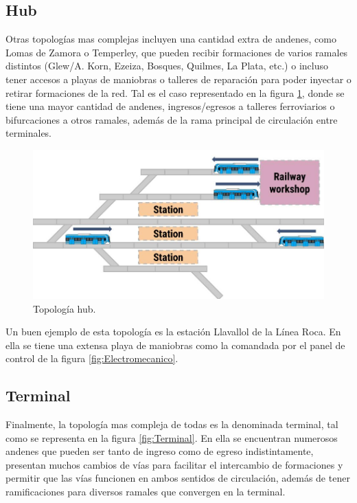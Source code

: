 	\subsection{Hub}
	
		Otras topologías mas complejas incluyen una cantidad extra de andenes, como Lomas de Zamora o Temperley, que pueden recibir formaciones de varios ramales distintos (Glew/A. Korn, Ezeiza, Bosques, Quilmes, La Plata, etc.) o incluso tener accesos a playas de maniobras o talleres de reparación para poder inyectar o retirar formaciones de la red. Tal es el caso representado en la figura \ref{fig:Hub}, donde se tiene una mayor cantidad de andenes, ingresos/egresos a talleres ferroviarios o bifurcaciones a otros ramales, además de la rama principal de circulación entre terminales. 
		
			\begin{figure}[h]
			\centering
				\includegraphics[scale=.45]{./Figures/Hub}
				\caption{Topología hub.}
				\label{fig:Hub}
			\end{figure}
	
		Un buen ejemplo de esta topología es la estación Llavallol de la Línea Roca. En ella se tiene una extensa playa de maniobras como la comandada por el panel de control de la figura \ref{fig:Electromecanico}.
		
	\subsection{Terminal}
		
		Finalmente, la topología mas compleja de todas es la denominada terminal, tal como se representa en la figura \ref{fig:Terminal}. En ella se encuentran numerosos andenes que pueden ser tanto de ingreso como de egreso indistintamente, presentan muchos cambios de vías para facilitar el intercambio de formaciones y permitir que las vías funcionen en ambos sentidos de circulación, además de tener ramificaciones para diversos ramales que convergen en la terminal.
		
